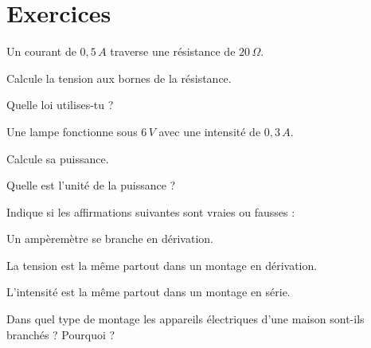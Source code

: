 \documentclass[12pt]{article}
\begin{document}
\section{Exercices}

\begin{exercice}{}{}
    Un courant de \(0{,}5\,A\) traverse une résistance de \(20\,\Omega\).
    
    \begin{enumeratebf}
        \item Calcule la tension aux bornes de la résistance.
        \item Quelle loi utilises-tu ?
    \end{enumeratebf}
\end{exercice}

\begin{exercice}{}{}
    Une lampe fonctionne sous \(6\,V\) avec une intensité de \(0{,}3\,A\).
    
    \begin{enumeratebf}
        \item Calcule sa puissance.
        \item Quelle est l’unité de la puissance ?
    \end{enumeratebf}
\end{exercice}

\begin{exercice}{}{}
    Indique si les affirmations suivantes sont vraies ou fausses :
    
    \begin{enumeratebf}
        \item Un ampèremètre se branche en dérivation.
        \item La tension est la même partout dans un montage en dérivation.
        \item L’intensité est la même partout dans un montage en série.
    \end{enumeratebf}
\end{exercice}

\begin{exercice}{}{}
    Dans quel type de montage les appareils électriques d’une maison sont-ils branchés ? Pourquoi ?
\end{exercice}
\end{document}
